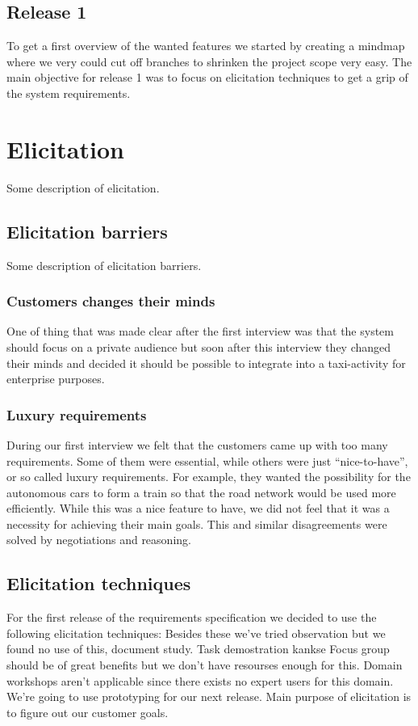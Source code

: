\documentclass[10pt]{article}
\begin{document}
\subsection{Release 1}
To get a first overview of the wanted features we started by creating a mindmap where we very could cut off branches to shrinken the project scope very easy. The main objective for release 1 was to focus on elicitation techniques to get a grip of the system requirements.

\section{Elicitation}
\sloppy
\noindent Some description of elicitation.
\subsection{Elicitation barriers}
Some description of elicitation barriers.
\subsubsection{Customers changes their minds}
One of thing that was made clear after the first interview was that the system should focus on a private audience but soon after this interview they changed their minds and decided it should be possible to integrate into a taxi-activity for enterprise purposes.
\subsubsection{Luxury requirements}
During our first interview we felt that the customers came up with too many requirements. Some of them were essential, while others were just “nice-to-have”, or so called luxury requirements. For example, they wanted the possibility for the autonomous cars to form a train so that the road network would be used more efficiently. While this was a nice feature to have, we did not feel that it was a necessity for achieving their main goals. This and similar disagreements were solved by negotiations and reasoning. 

\subsection{Elicitation techniques}
For the first release of the requirements specification we decided to use the following elicitation techniques:
Besides these we’ve tried observation but we found no use of this, document study.
Task demostration kankse
Focus group should be of great benefits but we don’t have resourses enough for this.
Domain workshops aren’t applicable since there exists no expert users for this domain.
We’re going to use prototyping for our next release.
Main purpose of elicitation is to figure out our customer goals.
\end{document}
